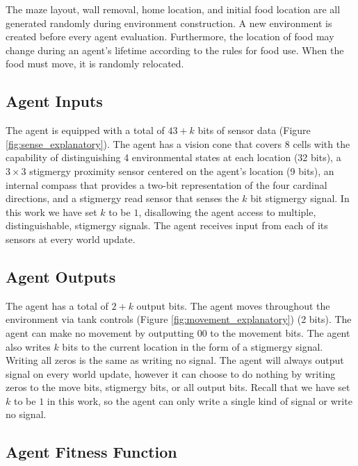 

The maze layout, wall removal, home location, and initial food location are all generated randomly during environment construction. A new environment is created before every agent evaluation. Furthermore, the location of food may change during an agent's lifetime according to the rules for food use. When the food must move, it is randomly relocated.

\subsection*{Agent Inputs}

The agent is equipped with a total of $43+k$ bits of sensor data (Figure \ref{fig:sense_explanatory}). The agent has a vision cone that covers 8 cells with the capability of distinguishing 4 environmental states at each location (32 bits), a $3\times 3$ stigmergy proximity sensor centered on the agent's location (9 bits), an internal compass that provides a two-bit representation of the four cardinal directions, and a stigmergy read sensor that senses the $k$ bit stigmergy signal. In this work we have set $k$ to be $1$, disallowing the agent access to multiple, distinguishable, stigmergy signals. The agent receives input from each of its sensors at every world update.



\subsection*{Agent Outputs}

The agent has a total of $2+k$ output bits. The agent moves throughout the environment via tank controls (Figure \ref{fig:movement_explanatory}) (2 bits). The agent can make no movement by outputting $00$ to the movement bits. The agent also writes $k$ bits to the current location in the form of a stigmergy signal. Writing all zeros is the same as writing no signal. The agent will always output signal on every world update, however it can choose to do nothing by writing zeros to the move bits, stigmergy bits, or all output bits. Recall that we have set $k$ to be $1$ in this work, so the agent can only write a single kind of signal or write no signal.



\subsection*{Agent Fitness Function}

